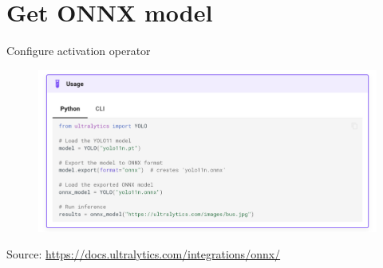 \documentclass{beamer}
\begin{document}
\section{Get ONNX model}
\begin{frame}{Configure activation operator}
  \begin{figure}[h]
    \includegraphics[width=1\textwidth]{images/ultralytics.png}
  \end{figure}
  \footnotesize Source: \href{https://docs.ultralytics.com/integrations/onnx/}{https://docs.ultralytics.com/integrations/onnx/}
\end{frame}
\end{document}
